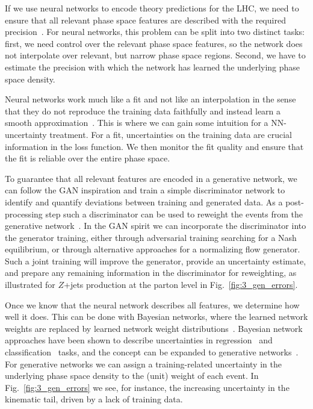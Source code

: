 \documentclass[submission,Phys]{SciPost}
\begin{document}
If we use neural networks to encode theory predictions for the LHC, we need to ensure that all relevant phase space features are described with the required precision~\cite{Nachman:2019dol}. For neural networks, this problem can be split into two distinct tasks: first, we need control over the relevant phase space features, so the network does not interpolate over relevant, but narrow phase space regions. Second, we have to estimate the precision with which the network has learned the underlying phase space density. 

Neural networks work much like a fit and not like an interpolation in the sense that they do  not reproduce the training data faithfully and instead learn a smooth approximation~\cite{Butter:2020qhk,Bieringer:2022cbs}. This is where we can gain some intuition for a NN-uncertainty treatment. For a fit, uncertainties on the training data are crucial information in the loss function. We then monitor the fit quality and ensure that the fit is reliable over the entire phase space. 

To guarantee that all relevant features are encoded in a generative network, we can follow the GAN inspiration and train a simple discriminator network to identify and quantify deviations between training and generated data. As a post-processing step such a discriminator can be used to reweight the events from the generative network~\cite{Diefenbacher:2020rna,Winterhalder:2021ave,Butter:2021csz}. In the GAN spirit we can incorporate the discriminator into the generator training, either through adversarial training searching for a Nash equilibrium, or through alternative approaches for a normalizing flow generator. Such a joint training will improve the generator, provide an uncertainty estimate, and prepare any remaining information in the discriminator for reweighting, as illustrated for $Z$+jets production at the parton level in Fig.~\ref{fig:3_gen_errors}.

Once we know that the neural network describes all features, we determine how well it does. This can be done with Bayesian networks, where the learned network weights are replaced by learned network weight distributions~\cite{bnn_early3,deep_errors}. Bayesian network approaches have been shown to describe uncertainties in regression~\cite{Kasieczka:2020vlh} and classification~\cite{Bollweg:2019skg} tasks, and the concept can be expanded to generative networks~\cite{Bellagente:2021yyh}. For generative networks we can assign a training-related uncertainty in the underlying phase space density to the (unit) weight of each event. In Fig.~\ref{fig:3_gen_errors} we see, for instance, the increasing uncertainty in the kinematic tail, driven by a lack of training data.
\end{document}
